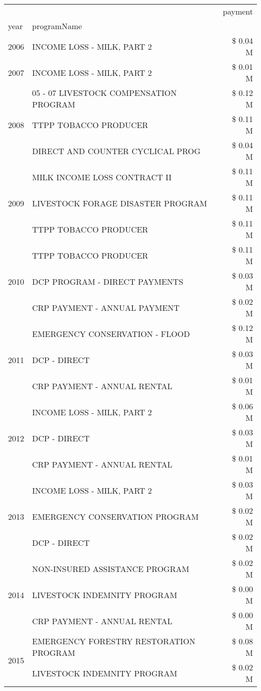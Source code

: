 \begin{tabular}{llr}
\toprule
 &  & payment \\
year & programName &  \\
\midrule
2006 & INCOME LOSS - MILK, PART 2 & \$ 0.04 M \\
\cline{1-3}
2007 & INCOME LOSS - MILK, PART 2 & \$ 0.01 M \\
\cline{1-3}
\multirow[t]{3}{*}{2008} & 05 - 07 LIVESTOCK COMPENSATION PROGRAM & \$ 0.12 M \\
 & TTPP TOBACCO PRODUCER & \$ 0.11 M \\
 & DIRECT AND COUNTER CYCLICAL PROG & \$ 0.04 M \\
\cline{1-3}
\multirow[t]{3}{*}{2009} & MILK INCOME LOSS CONTRACT II & \$ 0.11 M \\
 & LIVESTOCK FORAGE DISASTER  PROGRAM & \$ 0.11 M \\
 & TTPP TOBACCO PRODUCER & \$ 0.11 M \\
\cline{1-3}
\multirow[t]{3}{*}{2010} & TTPP TOBACCO PRODUCER & \$ 0.11 M \\
 & DCP PROGRAM - DIRECT PAYMENTS & \$ 0.03 M \\
 & CRP PAYMENT - ANNUAL PAYMENT & \$ 0.02 M \\
\cline{1-3}
\multirow[t]{3}{*}{2011} & EMERGENCY CONSERVATION - FLOOD & \$ 0.12 M \\
 & DCP - DIRECT & \$ 0.03 M \\
 & CRP PAYMENT - ANNUAL RENTAL & \$ 0.01 M \\
\cline{1-3}
\multirow[t]{3}{*}{2012} & INCOME LOSS - MILK, PART 2 & \$ 0.06 M \\
 & DCP - DIRECT & \$ 0.03 M \\
 & CRP PAYMENT - ANNUAL RENTAL & \$ 0.01 M \\
\cline{1-3}
\multirow[t]{3}{*}{2013} & INCOME LOSS - MILK, PART 2 & \$ 0.03 M \\
 & EMERGENCY CONSERVATION PROGRAM & \$ 0.02 M \\
 & DCP - DIRECT & \$ 0.02 M \\
\cline{1-3}
\multirow[t]{3}{*}{2014} & NON-INSURED ASSISTANCE PROGRAM & \$ 0.02 M \\
 & LIVESTOCK INDEMNITY PROGRAM & \$ 0.00 M \\
 & CRP PAYMENT - ANNUAL RENTAL & \$ 0.00 M \\
\cline{1-3}
\multirow[t]{3}{*}{2015} & EMERGENCY FORESTRY RESTORATION PROGRAM & \$ 0.08 M \\
 & LIVESTOCK INDEMNITY PROGRAM & \$ 0.02 M \\

\end{tabular}
